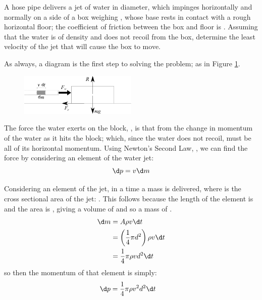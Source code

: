 
\begin{problem} %
{A hose pipe delivers a jet of water  in diameter, which impinges horizontally and normally on a side of a box weighing , whose base rests in contact with a rough horizontal floor; the coefficient of friction between the box and floor is .  Assuming that the water is of density  and does not recoil from the box, determine the least velocity of the jet that will cause the box to move.}
{}
{As always, a diagram is the first step to solving the problem; as in Figure \ref{fig:Dynamics_water_jet_block}.

\begin{figure}[h]
	\centering
	\includegraphics[width=0.5\textwidth]{../../../figures/Dynamics_water_jet_block}
	\caption{}
	\label{fig:Dynamics_water_jet_block}
\end{figure}

The force the water exerts on the block, , is that from the change in momentum of the water as it hits the block; which, since the water does not recoil, must be all of its horizontal momentum. Using Newton's Second Law, , we can find the force by considering an element of the water jet:
\begin{equation*} 
\d p = v \d m 
\end{equation*}

Considering an element of the jet, in a time  a mass  is delivered, where  is the cross sectional area of the jet: . This follows because the length of the element is  and the area is , giving a volume of  and so a mass of .
\begin{align*} 
\d m & = A \rho v \d t \\ 
&= \left(\frac{1}{4}\pi d^{2}\right) \rho v \d t \\
 &= \frac{1}{4} \pi \rho v d^{2} \d t 
 \end{align*}
so then the momentum of that element  is simply:
\begin{align*} 
\d p &= \frac{1}{4}\pi\rho v^{2} d^{2} \d t 
\end{align*}

}
\end{problem}
